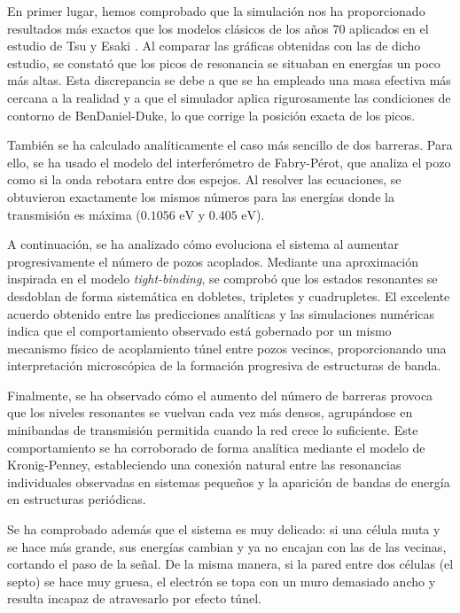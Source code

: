\documentclass[a4paper,12pt]{article}
\begin{document}
En primer lugar, hemos comprobado que la simulación nos ha proporcionado resultados más exactos que los modelos clásicos de los años 70 aplicados en el estudio de Tsu y Esaki \cite{tsu_esaki1973}. Al comparar las gráficas obtenidas con las de dicho estudio, se constató que los picos de resonancia se situaban en energías un poco más altas. Esta discrepancia se debe a que se ha empleado una masa efectiva más cercana a la realidad y a que el simulador aplica rigurosamente las condiciones de contorno de BenDaniel-Duke, lo que corrige la posición exacta de los picos.

También se ha calculado analíticamente el caso más sencillo de dos barreras. Para ello, se ha usado el modelo del interferómetro de Fabry-Pérot, que analiza el pozo como si la onda rebotara entre dos espejos. Al resolver las ecuaciones, se obtuvieron exactamente los mismos números para las energías donde la transmisión es máxima ($0.1056\text{ eV}$ y $0.405\text{ eV}$).

A continuación, se ha analizado cómo evoluciona el sistema al aumentar progresivamente el número de pozos acoplados. Mediante una aproximación inspirada en el modelo \textit{tight-binding}, se comprobó que los estados resonantes se desdoblan de forma sistemática en dobletes, tripletes y cuadrupletes. El excelente acuerdo obtenido entre las predicciones analíticas y las simulaciones numéricas indica que el comportamiento observado está gobernado por un mismo mecanismo físico de acoplamiento túnel entre pozos vecinos, proporcionando una interpretación microscópica de la formación progresiva de estructuras de banda.

Finalmente, se ha observado cómo el aumento del número de barreras provoca que los niveles resonantes se vuelvan cada vez más densos, agrupándose en minibandas de transmisión permitida cuando la red crece lo suficiente. Este comportamiento se ha corroborado de forma analítica mediante el modelo de Kronig-Penney, estableciendo una conexión natural entre las resonancias individuales observadas en sistemas pequeños y la aparición de bandas de energía en estructuras periódicas.

Se ha comprobado además que el sistema es muy delicado: si una célula muta y se hace más grande, sus energías cambian y ya no encajan con las de las vecinas, cortando el paso de la señal. De la misma manera, si la pared entre dos células (el septo) se hace muy gruesa, el electrón se topa con un muro demasiado ancho y resulta incapaz de atravesarlo por efecto túnel.
\end{document}
